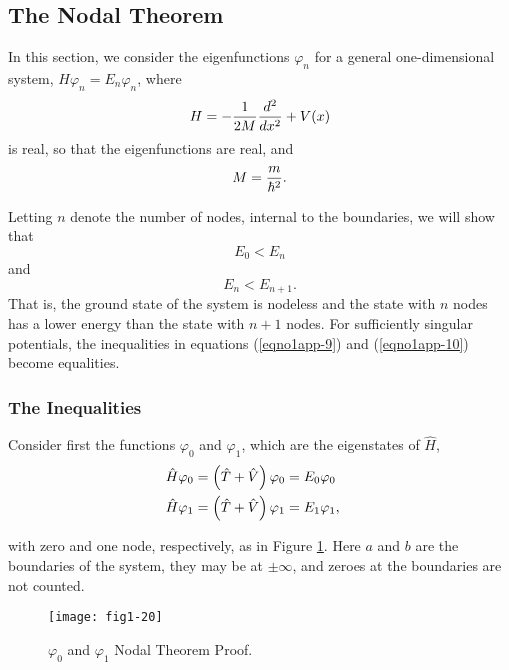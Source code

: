\subsection{The Nodal Theorem}
\label{app-c}
    
In this section, we consider the eigenfunctions $\varphi_n$ for a general 
one-dimensional system, $H \varphi_n = E_n \varphi_n$, where
\begin{equation}
H = - {1 \over 2M} {d^2 \over dx^2} + V (x)
\end{equation}
is real, so that the eigenfunctions are real, and
\begin{equation}
M = {m \over \hbar^2}.
\end{equation}

Letting $n$ denote the number of nodes, internal to the boundaries, we will 
show that
\begin{equation}
E_0 < E_n
\label{eqno1app-9}
\end{equation}
and
\begin{equation}
E_n < E_{n+1} .
\label{eqno1app-10}
\end{equation}
That is, the ground state of the system is nodeless and the state with
$n$ nodes has a lower energy than the state with $n + 1$ nodes. For
sufficiently singular potentials, the inequalities in equations
(\ref{eqno1app-9}) and (\ref{eqno1app-10}) become equalities.

\subsubsection{The Inequalities}

Consider first the functions $\varphi_0$ and $\varphi_1$, which are the 
eigenstates of ${\hat H}$,
\begin{eqnarray}
{\hat H} \varphi_0 &= \left( {\hat T} + {\hat V} \right) \varphi_0 = E_0 
\varphi_0\cr
{\hat H} \varphi_1 &= \left( {\hat T} + {\hat V} \right) \varphi_1 = E_1 
\varphi_1,\cr
\label{eqno1app-11}
\end{eqnarray}

with zero and one node, respectively, as in Figure \ref{fig1-20}. Here $a$ and 
$b$ are the boundaries of the system, they may be at $\pm \infty$, and 
zeroes at the boundaries are not counted.

\begin{figure}
\texttt{[image: fig1-20]}
\caption{$\varphi_0$ and $\varphi_1$ Nodal Theorem Proof.}
\label{fig1-20}
\end{figure}

